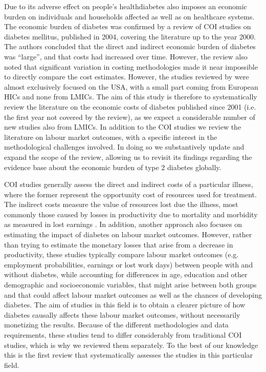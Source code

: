 Due to its adverse effect on people's health\DIFaddbegin \DIFadd{, }\DIFaddend diabetes also imposes an economic burden on individuals and households affected as well as on healthcare systems. The economic burden of diabetes was confirmed by \DIFdelbegin {}\DIFdelend a review of \ac{COI} studies on diabetes mellitus, published in 2004, covering the literature up to the year 2000. The authors concluded that the direct and indirect economic burden of diabetes was ``large'', and that costs had increased over time. However, the review also noted that significant variation in costing methodologies made it near impossible to directly compare the cost estimates. However, the studies reviewed by \textcite{Ettaro2004} were almost exclusively focused on the USA, with a small part coming from European \acp{HIC} and none from \acp{LMIC}. The aim of this study is therefore to systematically review the literature on the economic costs of diabetes published since 2001 (i.e. the first year not covered by the \textcite{Ettaro2004} review), as we expect a considerable number of new studies \DIFdelbegin \DIFdel{, }\DIFdelend also from \acp{LMIC}. In addition to the \ac{COI} studies we review the literature on labour market outcomes, with a specific interest in the methodological challenges involved. In doing so we substantively update and expand the scope of the \textcite{Ettaro2004} review, allowing us to revisit its findings regarding the evidence base about the economic burden of type 2 diabetes globally.

\ac{COI} studies generally assess the direct and indirect costs of a particular illness, where the former represent the opportunity cost of resources used for treatment. The indirect costs measure the value of resources lost due the illness, most commonly those caused by losses in productivity due to mortality and morbidity as measured in lost earnings \parencite{Segel2006}. In addition, another approach also focuses on estimating the impact of diabetes on labour market outcomes. However, rather than trying to estimate the monetary losses that arise from a decrease in productivity, these studies typically compare labour market outcomes (e.g. employment probabilities, earnings or lost work days) between people with and without diabetes, while accounting for differences in age, education and other demographic and socioeconomic variables, that might arise between both groups and that could affect labour market outcomes as well as the chances of developing diabetes. The aim of studies in this field is to obtain a clearer picture of how diabetes causally affects these labour market outcomes, without necessarily monetizing the results. Because of the different methodologies and data requirements, these studies tend to differ considerably from traditional \ac{COI} studies, which is why we reviewed them separately. To the best of our knowledge this is the first review that systematically assesses the studies in this particular field.


